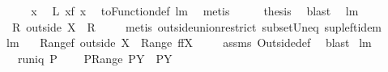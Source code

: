 \begin{isabellebody}
%
\isadelimproof
%
\endisadelimproof
%
\isatagproof
{}\isamarkupfalse%
\ {\isacharminus}\isanewline
\ \ \isacommand{{\isacharbraceleft}}\isamarkupfalse%
\isamarkupfalse%
\ x\ \isamarkupfalse%
\ {\isachardoublequoteopen}{\isacharquery}L\ x{\isacharequal}f\ x{\isachardoublequoteclose}\ \isamarkupfalse%
\ toFunction{\isacharunderscore}def\ lm{}{}{}\ \isamarkupfalse%
\ metis\isacommand{{\isacharbraceright}}\isamarkupfalse%
\ \isanewline
\ \ \isamarkupfalse%
\ {\isacharquery}thesis\ \isamarkupfalse%
\ blast\ \isanewline
{}\isamarkupfalse%
%
\endisatagproof
{\isafoldproof}%
%
\isadelimproof
\isanewline
%
\endisadelimproof
\isanewline
{}\isamarkupfalse%
\ lm{}{}{}{\isacharcolon}\ \isanewline
\ \ {\isachardoublequoteopen}R\ outside\ X\ {\isasymsubseteq}\ R{\isachardoublequoteclose}\ \isanewline
%
\isadelimproof
\ \ %
\endisadelimproof
%
\isatagproof
{}\isamarkupfalse%
\ {\isacharparenleft}metis\ outside{\isacharunderscore}union{\isacharunderscore}restrict\ subset{\isacharunderscore}Un{\isacharunderscore}eq\ sup{\isacharunderscore}left{\isacharunderscore}idem{\isacharparenright}%
\endisatagproof
{\isafoldproof}%
%
\isadelimproof
\isanewline
%
\endisadelimproof
\isanewline
{}\isamarkupfalse%
\ lm{}{}{}{\isacharcolon}\ \isanewline
\ \ {\isachardoublequoteopen}Range{\isacharparenleft}f\ outside\ X{\isacharparenright}\ {\isasymsupseteq}\ {\isacharparenleft}Range\ f{\isacharparenright}{\isacharminus}{\isacharparenleft}f{\isacharbackquote}{\isacharbackquote}X{\isacharparenright}{\isachardoublequoteclose}\ \isanewline
%
\isadelimproof
\ \ %
\endisadelimproof
%
\isatagproof
{}\isamarkupfalse%
\ assms\ Outside{\isacharunderscore}def\ \isamarkupfalse%
\ blast%
\endisatagproof
{\isafoldproof}%
%
\isadelimproof
\isanewline
%
\endisadelimproof
\isanewline
{}\isamarkupfalse%
\ lm{}{}{}{\isacharcolon}\ \isanewline
\ \ \ {\isachardoublequoteopen}runiq\ P{\isachardoublequoteclose}\ \isanewline
\ \ \ {\isachardoublequoteopen}{\isacharparenleft}P{\isasyminverse}{\isacharbackquote}{\isacharbackquote}{\isacharparenleft}{\isacharparenleft}Range\ P{\isacharparenright}{\isacharminus}Y{\isacharparenright}{\isacharparenright}\ {\isasyminter}\ {\isacharparenleft}{\isacharparenleft}P{\isasyminverse}{\isacharparenright}{\isacharbackquote}{\isacharbackquote}Y{\isacharparenright}\ \ \ {\isacharequal}\ \ \ {\isacharbraceleft}{\isacharbraceright}{\isachardoublequoteclose}\isanewline

\end{isabellebody}
